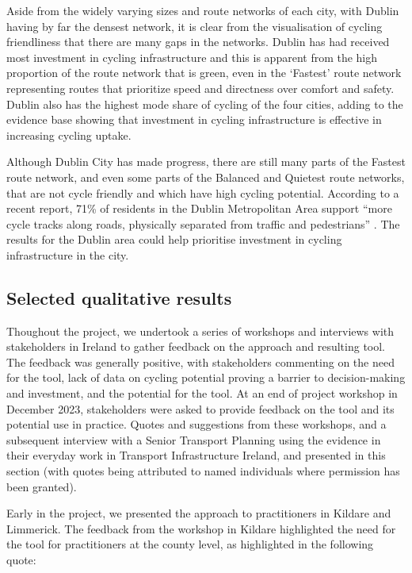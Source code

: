 \documentclass[
  super,
  preprint,
  3p]{elsarticle}
\begin{document}
Aside from the widely varying sizes and route networks of each city,
with Dublin having by far the densest network, it is clear from the
visualisation of cycling friendliness that there are many gaps in the
networks. Dublin has had received most investment in cycling
infrastructure and this is apparent from the high proportion of the
route network that is green, even in the `Fastest' route network
representing routes that prioritize speed and directness over comfort
and safety. Dublin also has the highest mode share of cycling of the
four cities, adding to the evidence base showing that investment in
cycling infrastructure is effective in increasing cycling uptake.

Although Dublin City has made progress, there are still many parts of
the Fastest route network, and even some parts of the Balanced and
Quietest route networks, that are not cycle friendly and which have high
cycling potential. According to a recent report, 71\% of residents in
the Dublin Metropolitan Area support ``more cycle tracks along roads,
physically separated from traffic and pedestrians'' \citep{walking2021}.
The results for the Dublin area could help prioritise investment in
cycling infrastructure in the city.

\subsection{Selected qualitative results}\label{sec-qualitative}

Thoughout the project, we undertook a series of workshops and interviews
with stakeholders in Ireland to gather feedback on the approach and
resulting tool. The feedback was generally positive, with stakeholders
commenting on the need for the tool, lack of data on cycling potential
proving a barrier to decision-making and investment, and the potential
for the tool. At an end of project workshop in December 2023,
stakeholders were asked to provide feedback on the tool and its
potential use in practice. Quotes and suggestions from these workshops,
and a subsequent interview with a Senior Transport Planning using the
evidence in their everyday work in Transport Infrastructure Ireland, and
presented in this section (with quotes being attributed to named
individuals where permission has been granted).

Early in the project, we presented the approach to practitioners in
Kildare and Limmerick. The feedback from the workshop in Kildare
highlighted the need for the tool for practitioners at the county level,
as highlighted in the following quote:
\end{document}
